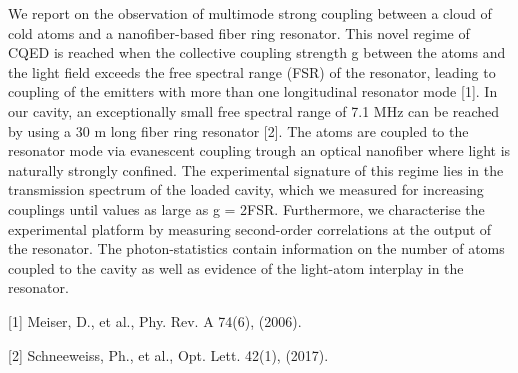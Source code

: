 \documentclass{scdpg}
\begin{document}
\begin{scAbstract}
\scNoUseTeX
{}
\scBeginText
We report on the observation of multimode strong coupling between a cloud of cold atoms and a nanofiber-based fiber ring resonator. This novel regime of CQED is reached when the collective coupling strength g between the atoms and the light field exceeds the free spectral range (FSR) of the resonator, leading to coupling of the emitters with more than one longitudinal resonator mode [1].
In our cavity, an exceptionally small free spectral range of 7.1 MHz can be reached by using a 30 m long fiber ring resonator [2].
The atoms are coupled to the resonator mode via evanescent coupling trough an optical nanofiber where light is naturally strongly confined.
The experimental signature of this regime lies in the transmission spectrum of the loaded cavity, which we measured for increasing couplings until values as large as g = 2FSR.
Furthermore, we characterise the experimental platform by measuring second-order correlations at the output of the resonator.
The photon-statistics contain information on the number of atoms coupled to the cavity as well as evidence of the light-atom interplay in the resonator.

[1] Meiser, D., et al., Phy. Rev. A 74(6), (2006).

[2] Schneeweiss, Ph., et al., Opt. Lett. 42(1), (2017).
\scEndText
{}
\end{scAbstract}
\end{document}
